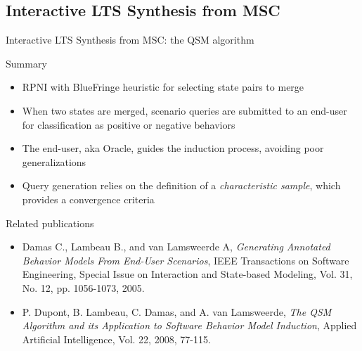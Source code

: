 \documentclass[11pt]{beamer}
\begin{document}
\subsection{Interactive LTS Synthesis from MSC}
\begin{frame}{Interactive LTS Synthesis from MSC: the QSM algorithm}
	\begin{block}{Summary}
		\begin{itemize}
			\item RPNI with BlueFringe heuristic for selecting state pairs to merge
			\item When two states are merged, scenario queries are submitted to an end-user for classification as positive or negative behaviors
			\item The end-user, aka Oracle, guides the induction process, avoiding poor generalizations
			\item Query generation relies on the definition of a \emph{characteristic sample}, which provides a convergence criteria
		\end{itemize}
	\end{block}
	\begin{block}{Related publications}
   		\scriptsize
		\begin{itemize}
			\item Damas C., Lambeau B., and van Lamsweerde A, \emph{Generating Annotated Behavior Models From End-User Scenarios},
			     	IEEE Transactions on Software Engineering, Special Issue on Interaction and State-based Modeling, Vol. 31, No. 12, pp. 1056-1073, 2005.
			\item P. Dupont, B. Lambeau, C. Damas, and A. van Lamsweerde, \emph{The QSM Algorithm and its Application to Software Behavior Model Induction},
         		                   Applied Artificial Intelligence, Vol. 22, 2008, 77-115.
		\end{itemize}
	   \end{block}
\end{frame}
\end{document}
